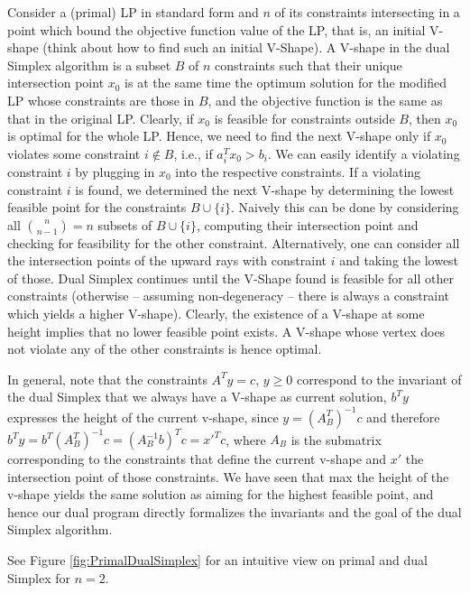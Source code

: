 \documentclass{article}
\begin{document}
Consider a (primal) LP in standard form and $n$ of its constraints intersecting in a point which bound the objective function value of the LP, that is, an initial V-shape (think about how to find such an initial V-Shape).
A V-shape in the dual Simplex algorithm is a subset $B$ of $n$ constraints such that their unique intersection point $x_0$ is at the same time the optimum solution for the modified LP whose constraints are those in $B$, and the objective function is the same as that in the original LP. 
Clearly, if $x_0$ is feasible for constraints outside $B$, then $x_0$ is optimal for the whole LP.
Hence, we need to find the next V-shape only if $x_0$ violates some constraint $i \notin B$, i.e., if $a_i^Tx_0 > b_i$.
We can easily identify a violating constraint $i$ by plugging in $x_0$ into the respective constraints. If a violating constraint $i$ is found, we determined the next V-shape by determining the lowest feasible point for the constraints $B\cup \{i\}$. Naively this can be done by considering all ${n\choose n-1} =n$ subsets of $B\cup\{i\}$, computing their intersection point and checking for feasibility for the other constraint. Alternatively, one can consider all the intersection points of the upward rays with constraint $i$ and taking the lowest of those.
Dual Simplex continues until the V-Shape found is feasible for all other constraints (otherwise -- assuming non-degeneracy -- there is always a constraint which yields a higher V-shape). Clearly, the existence of a V-shape at some height implies that no lower feasible point exists. A V-shape whose vertex does not violate any of the other constraints is hence optimal.
 

In general, note that the constraints $A^Ty=c$, $y\geq 0$ correspond to the invariant of the dual Simplex that we always have a V-shape as current solution, $b^Ty$ expresses the height of the current v-shape, since $y=(A_B^T)^{-1}c$ and therefore $b^Ty=b^T(A_B^T)^{-1}c=(A_B^{-1}b)^Tc = x'^T c$, where $A_B$ is the submatrix corresponding to the constraints that define the current v-shape and $x'$ the intersection point of those constraints. We have seen that max the height of the v-shape yields the same solution as aiming for the highest feasible point, and hence our dual program directly formalizes the invariants and the goal of the dual Simplex algorithm.

See Figure \ref{fig:PrimalDualSimplex} for an intuitive view on primal and dual Simplex for $n=2$.
\end{document}
